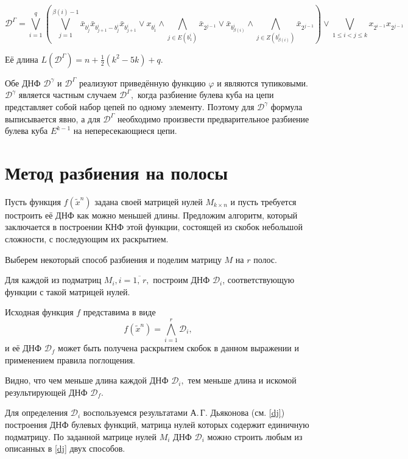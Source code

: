 \documentclass[12pt,a4paper,oneside,fleqn,leqno]{article}
\theoremstyle{definition}
\begin{document}
			$$
				\mathcal{D}^{\Gamma} = \bigvee_{i = 1}^q \left(\bigvee_{j = 1}^{\beta(i) - 1} \bar{x}_{b_j^i} \bar{x}_{b_{j + 1}^i - b_j^i} \bar{x}_{b_{j + 1}^i} \vee x_{b_1^i} \wedge \bigwedge_{j \in E(b_1^i)}\bar{x}_{2^{j - 1}} \vee \bar{x}_{b^i_{\beta(i)}} \wedge \bigwedge_{j \in Z(b^i_{\beta(i)})}\bar{x}_{2^{j - 1}} \right)
				 \vee \bigvee_{1 \leqslant i < j \leqslant k} x_{2^{i - 1}} x_{2^{j - 1}}
			$$\par
			Её длина $L(\mathcal{D}^{\Gamma}) = n + \frac{1}{2}(k^2 - 5k) + q.$\par
			Обе ДНФ $\mathcal{D}^{\gamma}$ и $\mathcal{D}^{\Gamma}$ реализуют приведённую функцию $\varphi$ и являются тупиковыми. $\mathcal{D}^{\gamma}$ является частным случаем $\mathcal{D}^{\Gamma},$ когда разбиение булева куба на цепи представляет собой набор цепей по одному элементу. Поэтому для $\mathcal{D}^{\gamma}$ формула выписывается явно, а для $\mathcal{D}^{\Gamma}$ необходимо произвести предварительное разбиение булева куба $E^{k - 1}$ на непересекающиеся цепи.\par
	\section{Метод разбиения на полосы}
		Пусть функция $f(\tilde x^n)$ задана своей матрицей нулей $M_{k \times n}$ и пусть требуется построить её ДНФ как можно меньшей длины. Предложим алгоритм, который заключается в построении КНФ этой функции, состоящей из скобок небольшой сложности, с последующим их раскрытием.\par
		Выберем некоторый способ разбиения и поделим матрицу $M$ на $r$ полос.\par
		Для каждой из подматриц $M_i, i = \overline{1,\,r},$ построим ДНФ $\mathcal{D}_i$, соответствующую функции с такой матрицей нулей.\par
		Исходная функция $f$ представима в виде
		$$
			f(\tilde x^n) = \bigwedge_{i = 1}^r \mathcal{D}_i,
		$$
		и её ДНФ $\mathcal{D}_f$ может быть получена раскрытием скобок в данном выражении и применением правила поглощения.\par
		Видно, что чем меньше длина каждой ДНФ $\mathcal{D}_i,$ тем меньше длина и искомой результирующей ДНФ $\mathcal{D}_f.$\par
		Для определения $\mathcal{D}_i$ воспользуемся результатами А.\,Г. Дьяконова (см. \ref{dj}) построения ДНФ булевых функций, матрица нулей которых содержит единичную подматрицу. По заданной матрице нулей $M_i$ ДНФ $\mathcal{D}_i$ можно строить любым из описанных в \ref{dj} двух способов. 
\end{document}
